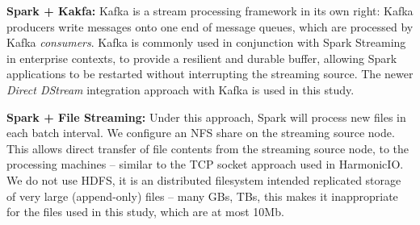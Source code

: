\documentclass[conference]{IEEEtran}
\begin{document}
\textbf{Spark + Kakfa:} Kafka is a stream processing framework in its own right: Kafka producers write messages onto one end of message queues, which are processed by Kafka \emph{consumers}. 
Kafka is commonly used in conjunction with Spark Streaming in enterprise contexts, to provide a resilient and durable buffer, allowing Spark applications to be restarted without interrupting the streaming source.  
The newer \emph{Direct DStream} integration approach with Kafka is used in this study. 

\textbf{Spark + File Streaming:} Under this approach, Spark will process new files in each batch interval. %
We configure an NFS share on the streaming source node. This allows direct transfer of file contents from the streaming source node, to the processing machines -- similar to the TCP socket approach used in HarmonicIO. 
We do not use HDFS, it is an distributed filesystem intended replicated storage of very large (append-only) files -- many GBs, TBs, this makes it inappropriate for the files used in this study, which are at most 10Mb. 
\end{document}
